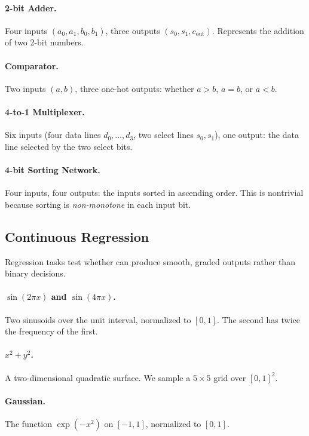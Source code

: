 \paragraph{2-bit Adder.} Four inputs $(a_0, a_1, b_0, b_1)$, three
outputs $(s_0, s_1, c_{\text{out}})$. Represents the addition of two
2-bit numbers.

\paragraph{Comparator.} Two inputs $(a, b)$, three one-hot outputs:
whether $a > b$, $a = b$, or $a < b$.

\paragraph{4-to-1 Multiplexer.} Six inputs (four data lines
$d_0, \ldots, d_3$, two select lines $s_0, s_1$), one output: the data
line selected by the two select bits.

\paragraph{4-bit Sorting Network.} Four inputs, four outputs: the
inputs sorted in ascending order. This is nontrivial because sorting
is \emph{non-monotone} in each input bit.

\subsection{Continuous Regression}
\label{sec:exp-regression}

Regression tasks test whether \modnet{} can produce smooth, graded
outputs rather than binary decisions.

\paragraph{$\sin(2\pi x)$ and $\sin(4\pi x)$.} Two sinusoids over the
unit interval, normalized to $[0, 1]$. The second has twice the
frequency of the first.

\paragraph{$x^2 + y^2$.} A two-dimensional quadratic surface. We sample
a $5 \times 5$ grid over $[0,1]^2$.

\paragraph{Gaussian.} The function $\exp(-x^2)$ on $[-1, 1]$, normalized
to $[0, 1]$.

